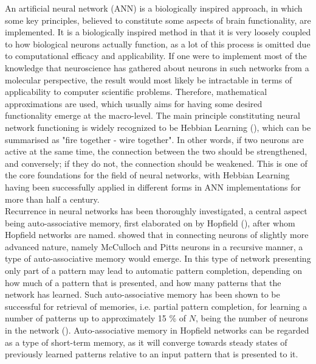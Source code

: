 An artificial neural network (ANN) is a biologically inspired approach, in which some key principles, believed to constitute some aspects of brain functionality, are implemented. It is a biologically inspired method in that it is very loosely coupled to how biological neurons actually function, as a lot of this process is omitted due to computational efficacy and applicability. If one were to implement most of the knowledge that neuroscience has gathered about neurons in such networks from a molecular perspective, the result would most likely be intractable in terms of applicability to computer scientific problems. Therefore, mathematical approximations are used, which usually aims for having some desired functionality emerge at the macro-level. The main principle constituting neural network functioning is widely recognized to be Hebbian Learning (\cite{Hebb1949}), which can be summarised as "fire together - wire together". In other words, if two neurons are active at the same time, the connection between the two should be strengthened, and conversely; if they do not, the connection should be weakened. This is one of the core foundations for the field of neural networks, with Hebbian Learning having been successfully applied in different forms in ANN implementations for more than half a century.
\\

Recurrence in neural networks has been thoroughly investigated, a central aspect being auto-associative memory, first elaborated on by Hopfield (\cite{Hopfield1982}), after whom Hopfield networks are named. \cite{Hopfield1982} showed that in connecting neurons of slightly more advanced nature, namely McCulloch and Pitts neurons in a recursive manner, a type of auto-associative memory would emerge. In this type of network presenting only part of a pattern may lead to automatic pattern completion, depending on how much of a pattern that is presented, and how many patterns that the network has learned. Such auto-associative memory has been shown to be successful for retrieval of memories, i.e. partial pattern completion, for learning a number of patterns up to approximately 15 \% of $N$, being the number of neurons in the network (\cite{Hopfield1982}). Auto-associative memory in Hopfield networks can be regarded as a type of short-term memory, as it will converge towards steady states of previously learned patterns relative to an input pattern that is presented to it.

